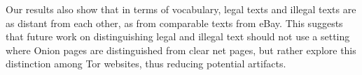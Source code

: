 \documentclass[11pt,a4paper,table]{article}
\begin{document}
  Our results also show that in terms of vocabulary, legal texts and illegal texts are as distant from each other, as from
  comparable texts from eBay.
  This suggests that future work on distinguishing legal and illegal text should not use a setting where Onion pages
    are distinguished from clear net pages, but rather explore this distinction among Tor websites, 
    thus reducing potential artifacts.




\end{document}
